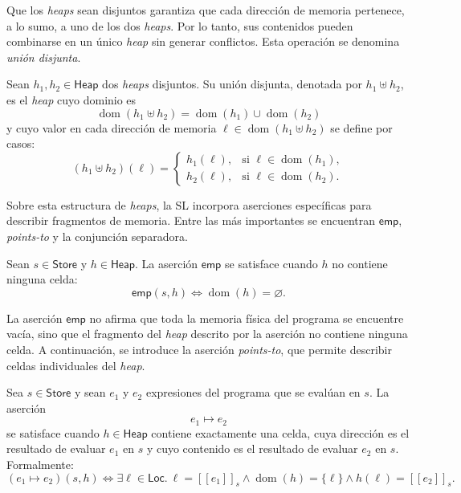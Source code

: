\documentclass[a4paper,	11pt]{report}
\begin{document}
Que los \emph{heaps} sean disjuntos garantiza que cada dirección de memoria pertenece, a lo sumo,
a uno de los dos \emph{heaps}.
Por lo tanto,
sus contenidos pueden combinarse en un único \emph{heap} sin generar conflictos.
Esta operación se denomina \emph{unión disjunta}.

\begin{definicion}
Sean $h_1, h_2 \in \mathsf{Heap}$ dos \emph{heaps} disjuntos.
Su unión disjunta, denotada por $h_1 \uplus h_2$,
es el \emph{heap} cuyo dominio es
$$\operatorname{dom}(h_1 \uplus h_2) = \operatorname{dom}(h_1) \cup \operatorname{dom}(h_2)$$
y cuyo valor en cada dirección de memoria
$\ell \in \operatorname{dom}(h_1 \uplus h_2)$ se define por casos:
$$(h_1 \uplus h_2)(\ell) =
\begin{cases}
h_1(\ell), & \text{si } \ell \in \operatorname{dom}(h_1), \\
h_2(\ell), & \text{si } \ell \in \operatorname{dom}(h_2).
\end{cases}$$
\end{definicion}

Sobre esta estructura de \emph{heaps},
la SL incorpora aserciones específicas para describir fragmentos de memoria.
Entre las más importantes se encuentran $\mathsf{emp}$, \emph{points-to} y la conjunción separadora.

\begin{definicion}
\label{def:heap_vacio}
Sean $s \in \mathsf{Store}$ y $h \in \mathsf{Heap}$.
La aserción $\mathsf{emp}$ se satisface cuando $h$ no contiene ninguna celda:
$$\mathsf{emp}(s,h) \iff \operatorname{dom}(h) = \varnothing.$$
\end{definicion}

La aserción $\mathsf{emp}$ no afirma que toda la memoria física del programa se encuentre vacía,
sino que el fragmento del \emph{heap} descrito por la aserción no contiene ninguna celda.
A continuación,
se introduce la aserción \emph{points-to},
que permite describir celdas individuales del \emph{heap}.

\begin{definicion}[Points-to]
\label{def:points_to}
Sea $s \in \mathsf{Store}$ y sean $e_1$ y $e_2$ expresiones del programa que se evalúan en $s$.
La aserción
$$e_1 \mapsto e_2$$
se satisface cuando $h \in \mathsf{Heap}$ contiene exactamente una celda,
cuya dirección es el resultado de evaluar $e_1$ en $s$ y cuyo contenido es el resultado de evaluar $e_2$ en $s$.
Formalmente:
$$(e_1 \mapsto e_2)(s, h) \iff \exists \ell \in \mathsf{Loc}. \
\ell = [\![e_1]\!]_s \land \operatorname{dom}(h) = \{\ell\} \land h(\ell) = [\![e_2]\!]_s.$$
\end{definicion}
\end{document}
